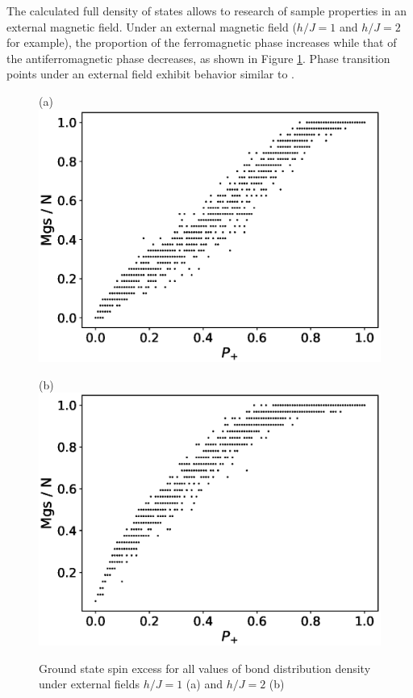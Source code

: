 \documentclass[preprint,12pt]{elsarticle}
\begin{document}
The calculated full density of states allows to research of sample properties in an external magnetic field. Under an external magnetic field ($h/J = 1$ and $h/J = 2$ for example), the proportion of the ferromagnetic phase increases while that of the antiferromagnetic phase decreases, as shown in Figure \ref{fig:Mgs(P+)_H}. Phase transition points under an external field exhibit behavior similar to \cite{trukhin2024thermodynamic}.

\begin{figure}[H]
	\begin{minipage}[h]{0.45\linewidth}
		\centering (a)
		\includegraphics[width=1\linewidth]{images/Mgs(P+)_H1.eps}
	\end{minipage}
	\hfill
	\begin{minipage}[h]{0.45\linewidth}
		\centering (b)
		\includegraphics[width=1\linewidth]{images/Mgs(P+)_H2.eps}
	\end{minipage}
	\caption{Ground state spin excess for all values of bond distribution density under external fields $h/J = 1$ (a) and $h/J = 2$ (b)}
	\label{fig:Mgs(P+)_H}
\end{figure}
\end{document}
